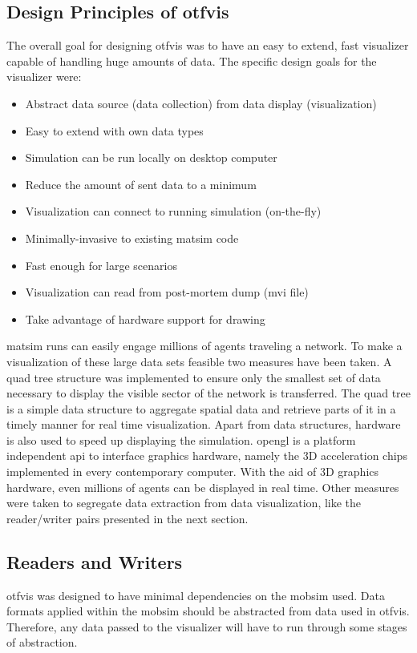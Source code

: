\subsection{Design Principles of \gls{otfvis}}
The overall goal for designing \gls{otfvis} was to have an easy to extend, fast visualizer capable of handling huge amounts of data. 
The specific design goals for the visualizer were:
%
\begin{itemize}
\item Abstract data source (data collection) from data display (visualization)
\item Easy to extend with own data types
\item Simulation can be run locally on desktop computer
\item Reduce the amount of sent data to a minimum
\item Visualization can connect to running simulation (on-the-fly)
\item Minimally-invasive to existing \gls{matsim} code
\item Fast enough for large scenarios
\item Visualization can read from post-mortem dump (\gls{mvi} file)
\item Take advantage of hardware support for drawing
\end{itemize}
%
\gls{matsim} runs can easily engage millions of agents traveling a network. To make a visualization of these large data sets feasible two measures have been taken. A quad tree structure was implemented to ensure only the smallest set of data necessary to display the visible sector of the network is transferred. The quad tree is a simple data structure to aggregate spatial data and retrieve parts of it in a timely manner for real time visualization. Apart from data structures, hardware is also used to speed up displaying the simulation. \gls{opengl} is a platform independent \gls{api} to interface graphics hardware, namely the 3D acceleration chips implemented in every contemporary computer. With the aid of 3D graphics hardware, even millions of agents can be displayed in real time. Other measures were taken to segregate data extraction from data visualization, like the reader/writer pairs presented in the next section.

\subsection{Readers and Writers}
\gls{otfvis} was designed to have minimal dependencies on the \gls{mobsim} used. Data formats applied within the \gls{mobsim} should be abstracted from data used in \gls{otfvis}. Therefore, any data passed to the visualizer will have to run through some stages of abstraction.

